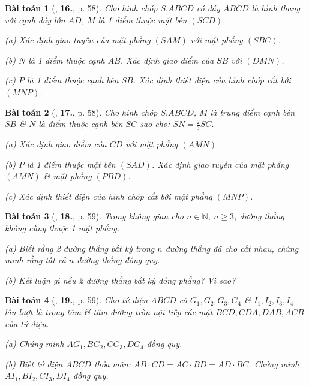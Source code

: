 \documentclass{article}
\numberwithin{equation}{section}
\newtheorem{baitoan}{Bài toán}[section]
\begin{document}
\begin{baitoan}[\cite{TL_chuyen_Toan_Hinh_Hoc_11}, \textbf{16.}, p. 58]
	Cho hình chóp $S.ABCD$ có đáy $ABCD$ là hình thang với cạnh đáy lớn $AD$, $M$ là 1 điểm thuộc mặt bên $(SCD)$.
	\begin{enumerate*}
		\item[(a)] Xác định giao tuyến của mặt phẳng $(SAM)$ với mặt phẳng $(SBC)$.
		\item[(b)] $N$ là 1 điểm thuộc cạnh $AB$. Xác định giao điểm của $SB$ với $(DMN)$.
		\item[(c)] $P$ là 1 điểm thuộc cạnh bên $SB$. Xác định thiết diện của hình chóp cắt bởi $(MNP)$.
	\end{enumerate*}
\end{baitoan}

\begin{baitoan}[\cite{TL_chuyen_Toan_Hinh_Hoc_11}, \textbf{17.}, p. 58]
	Cho hình chóp $S.ABCD$, $M$ là trung điểm cạnh bên $SB$ \& $N$ là điểm thuộc cạnh bên $SC$ sao cho: $SN = \frac{2}{3}SC$.
	\begin{enumerate*}
		\item[(a)] Xác định giao điểm của $CD$ với mặt phẳng $(AMN)$.
		\item[(b)] $P$ là 1 điểm thuộc mặt bên $(SAD)$. Xác định giao tuyến của mặt phẳng $(AMN)$ \& mặt phẳng $(PBD)$.
		\item[(c)] Xác định thiết diện của hình chóp cắt bởi mặt phẳng $(MNP)$.
	\end{enumerate*}
\end{baitoan}

\begin{baitoan}[\cite{TL_chuyen_Toan_Hinh_Hoc_11}, \textbf{18.}, p. 59]
	Trong không gian cho $n\in\mathbb{N}$, $n\ge 3$, đường thẳng không cùng thuộc 1 mặt phẳng.
	\begin{enumerate*}
		\item[(a)] Biết rằng 2 đường thẳng bất kỳ trong $n$ đường thẳng đã cho cắt nhau, chứng minh rằng tất cả $n$ đường thẳng đồng quy.
		\item[(b)] Kết luận gì nếu 2 đường thẳng bất kỳ đồng phẳng? Vì sao?
	\end{enumerate*}
\end{baitoan}

\begin{baitoan}[\cite{TL_chuyen_Toan_Hinh_Hoc_11}, \textbf{19.}, p. 59]
	Cho tứ diện $ABCD$ có $G_1,G_2,G_3,G_4$ \& $I_1,I_2,I_3,I_4$ lần lượt là trọng tâm \& tâm đường tròn nội tiếp các mặt $BCD,CDA,DAB,ACB$ của tứ diện. 
	\begin{enumerate*}
		\item[(a)] Chứng minh $AG_1,BG_2,CG_3,DG_4$ đồng quy.
		\item[(b)] Biết tứ diện $ABCD$ thỏa mãn: $AB\cdot CD = AC\cdot BD = AD\cdot BC$. Chứng minh $AI_1,BI_2,CI_3,DI_4$ đồng quy.
	\end{enumerate*}
\end{baitoan}
\end{document}
